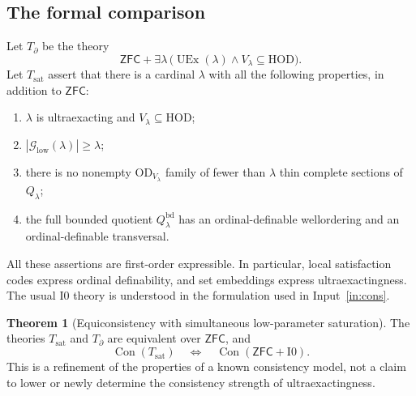 \documentclass[11pt,letterpaper]{article}
\theoremstyle{definition}
\newtheorem{theorem}[definition]{Theorem}
\newcommand{\ZFC}{\mathsf{ZFC}}
\newcommand{\HOD}{\mathrm{HOD}}
\newcommand{\OD}{\mathrm{OD}}
\newcommand{\UEx}{\operatorname{UEx}}
\newcommand{\Con}{\operatorname{Con}}
\newcommand{\Izero}{\mathrm{I0}}
\numberwithin{equation}{section}
\newcommand{\Good}{\mathcal G}
\newcommand{\Tbase}{T_{\partial}}
\newcommand{\Tsat}{T_{\mathrm{sat}}}
\begin{document}
\subsection{The formal comparison}

Let $\Tbase$ be the theory
\[
           \ZFC+\exists\lambda\,
                 \bigl(\UEx(\lambda)\wedge V_\lambda\subseteq\HOD\bigr).
\]
Let $\Tsat$ assert that there is a cardinal $\lambda$ with all the following
properties, in addition to $\ZFC$:
\begin{enumerate}[label=\textup{(\roman*)}]
\item $\lambda$ is ultraexacting and $V_\lambda\subseteq\HOD$;
\item $|\Good_{\mathrm{low}}(\lambda)|\ge\lambda$;
\item there is no nonempty $\OD_{V_\lambda}$ family of fewer than $\lambda$
      thin complete sections of $Q_\lambda$;
\item the full bounded quotient $Q^{\mathrm{bd}}_\lambda$ has an
      ordinal-definable wellordering and an ordinal-definable transversal.
\end{enumerate}
All these assertions are first-order expressible. In particular, local
satisfaction codes express ordinal definability, and set embeddings express
ultraexactingness. The usual $\Izero$ theory is understood in the formulation
used in Input~\ref{in:cons}.

\begin{theorem}[Equiconsistency with simultaneous low-parameter saturation]\label{thm:equiconsistency}
The theories $\Tsat$ and $\Tbase$ are equivalent over $\ZFC$, and
\begin{equation}\label{eq:equiconsistency}
           \Con(\Tsat)\quad\Longleftrightarrow\quad\Con(\ZFC+\Izero).
\end{equation}
This is a refinement of the properties of a known consistency model,
not a claim to lower or newly determine the consistency strength of
ultraexactingness.
\end{theorem}
\end{document}
